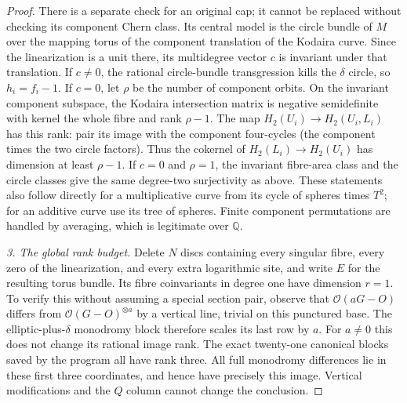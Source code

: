 \begin{proof}
There is a separate check for an original cap; it cannot be replaced
without checking its component Chern class. Its central model is
the circle bundle of $M$ over the mapping torus of the component
translation of the Kodaira curve. Since the linearization is a unit
there, its multidegree vector $c$ is invariant under that translation.
If $c\ne0$, the rational circle-bundle transgression kills the
$\delta$ circle, so $h_i=f_i-1$. If $c=0$, let $\rho$ be the number
of component orbits. On the invariant component subspace, the
Kodaira intersection matrix is negative semidefinite with kernel
the whole fibre and rank $\rho-1$. The map
$H_2(U_i)\to H_2(U_i,L_i)$ has this rank: pair its image with the
component four-cycles (the component times the two circle factors).
Thus the cokernel of $H_2(L_i)\to H_2(U_i)$ has dimension at least
$\rho-1$. If $c=0$ and $\rho=1$, the invariant fibre-area class
and the circle classes give the same degree-two surjectivity as
above. These statements also follow directly for a multiplicative
curve from its cycle of spheres times $T^2$; for an additive curve
use its tree of spheres. Finite component permutations are handled
by averaging, which is legitimate over $\mathbb Q$.

\emph{3. The global rank budget.}
Delete $N$ discs containing every singular fibre, every zero of the
linearization, and every extra logarithmic site, and write $E$ for
the resulting torus bundle. Its fibre coinvariants in degree one
have dimension $r=1$. To verify this without assuming a special
section pair, observe that $\mathcal O(aG-O)$ differs from
$\mathcal O(G-O)^{\otimes a}$ by a vertical line, trivial on this
punctured base. The elliptic-plus-$\delta$ monodromy block therefore
scales its last row by $a$. For $a\ne0$ this does not change its
rational image rank. The exact twenty-one canonical blocks saved
by the program all have rank three. All full monodromy differences
lie in these first three coordinates, and hence have precisely
this image. Vertical modifications and the $Q$ column cannot
change the conclusion.


\end{proof}
